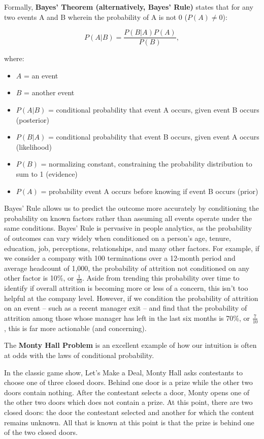 \documentclass[
]{book}
\providecommand{\tightlist}{%
  \setlength{\itemsep}{0pt}\setlength{\parskip}{0pt}}
\begin{document}
Formally, \textbf{Bayes' Theorem (alternatively, Bayes' Rule)} states that for any two events A and B wherein the probability of A is not 0 (\(P(A) \neq 0\)):

\[ P(A \vert B) = \frac{P(B \vert A) P(A)}{P(B)}, \]

where:

\begin{itemize}
\tightlist
\item
  \(A\) = an event
\item
  \(B\) = another event
\item
  \(P(A|B)\) = conditional probability that event A occurs, given event B occurs (posterior)
\item
  \(P(B|A)\) = conditional probability that event B occurs, given event A occurs (likelihood)
\item
  \(P(B)\) = normalizing constant, constraining the probability distribution to sum to 1 (evidence)
\item
  \(P(A)\) = probability event A occurs before knowing if event B occurs (prior)
\end{itemize}

Bayes' Rule allows us to predict the outcome more accurately by conditioning the probability on known factors rather than assuming all events operate under the same conditions. Bayes' Rule is pervasive in people analytics, as the probability of outcomes can vary widely when conditioned on a person's age, tenure, education, job, perceptions, relationships, and many other factors. For example, if we consider a company with 100 terminations over a 12-month period and average headcount of 1,000, the probability of attrition not conditioned on any other factor is 10\%, or \(\frac{1}{10}\). Aside from trending this probability over time to identify if overall attrition is becoming more or less of a concern, this isn't too helpful at the company level. However, if we condition the probability of attrition on an event -- such as a recent manager exit -- and find that the probability of attrition among those whose manager has left in the last six months is 70\%, or \(\frac{7}{10}\), this is far more actionable (and concerning).

The \textbf{Monty Hall Problem} is an excellent example of how our intuition is often at odds with the laws of conditional probability.

In the classic game show, Let's Make a Deal, Monty Hall asks contestants to choose one of three closed doors. Behind one door is a prize while the other two doors contain nothing. After the contestant selects a door, Monty opens one of the other two doors which does not contain a prize. At this point, there are two closed doors: the door the contestant selected and another for which the content remains unknown. All that is known at this point is that the prize is behind one of the two closed doors.
\end{document}
